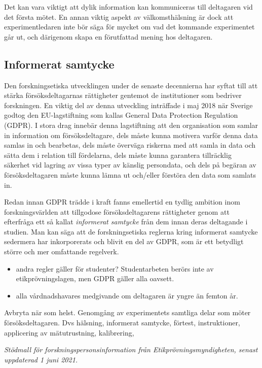 \documentclass[
]{book}
\begin{document}
Det kan vara viktigt att dylik information kan kommuniceras till deltagaren vid det första mötet. En annan viktig aspekt av välkomsthälsning är dock att experimentledaren inte bör säga för mycket om vad det kommande experimentet går ut, och därigenom skapa en förutfattad mening hos deltagaren.

\hypertarget{sub07.6.2}{%
\subsection{Informerat samtycke}\label{sub07.6.2}}

Den forskningsetiska utvecklingen under de senaste decennierna har syftat till att stärka försöksdeltagarnas rättigheter gentemot de institutioner som bedriver forskningen. En viktig del av denna utveckling inträffade i maj 2018 när Sverige godtog den EU-lagstiftning som kallas General Data Protection Regulation (GDPR). I stora drag innebär denna lagstiftning att den organisation som samlar in information om försöksdeltagare, dels måste kunna motivera varför denna data samlas in och bearbetas, dels måste överväga riskerna med att samla in data och sätta dem i relation till fördelarna, dels måste kunna garantera tillräcklig säkerhet vid lagring av vissa typer av känslig persondata, och dels på begäran av försöksdeltagaren måste kunna lämna ut och/eller förstöra den data som samlats in.

Redan innan GDPR trädde i kraft fanns emellertid en tydlig ambition inom forskningsvärlden att tillgodose försöksdeltagarens rättigheter genom att efterfråga ett så kallat \emph{informerat samtycke} från dem innan deras deltagande i studien. Man kan säga att de forskningsetiska reglerna kring informerat samtycke sedermera har inkorporerats och blivit en del av GDPR, som är ett betydligt större och mer omfattande regelverk.

\begin{itemize}
\item
  andra regler gäller för studenter? Studentarbeten berörs inte av etikprövningslagen, men GDPR gäller alla oavsett.
\item
  alla vårdnadshavares medgivande om deltagaren är yngre än femton år.
\end{itemize}

Avbryta när som helst. Genomgång av experimentets samtliga delar som möter försöksdeltagaren. Dvs hälsning, informerat samtycke, förtest, instruktioner, applicering av mätutrustning, kalibrering,

\emph{Stödmall för forskningspersonsinformation från Etikprövningsmyndigheten, senast uppdaterad 1 juni 2021.}
\end{document}
